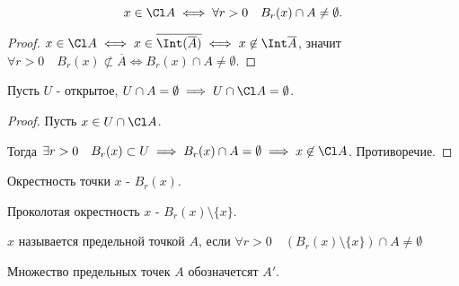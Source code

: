\begin{theorem} \thmslashn

    \[ x\in \Cl A \iff \forall{r > 0}\quad B_{r}(x)\cap A \neq \emptyset .\]

    \begin{proof} \thmslashn
        
        $x\in \Cl A \iff  x\in \overline{\Int(\overline{A})} \iff  x\not\in \Int \overline{A}$, значит $\forall{r > 0}\quad B_{r}(x) \not \subset \overline{A} \iff  B_{r}(x)\cap  A \neq  \emptyset$. 
    \end{proof}
\end{theorem}
\begin{consequence} \thmslashn

    Пусть $U$ - открытое, $U\cap A = \emptyset \implies U\cap \Cl A = \emptyset$.
    \begin{proof}
        Пусть $x\in U\cap \Cl A$.

        Тогда $\exists{r > 0}\quad B_{r}(x) \subset U \implies B_{r}(x)\cap A = \emptyset \implies x \not\in \Cl A$. Противоречие.
    \end{proof}
\end{consequence}
\begin{definition}[Окрестность] \thmslashn 

    Окрестность точки $x$ - $B_{r}(x)$.
\end{definition}
\begin{definition} \thmslashn 

    Проколотая окрестность $x$ - $B_{r}(x) \setminus \{x\} $.
\end{definition}
\begin{definition} \thmslashn 

    $x$ называется предельной точкой $A$, если $\forall{r > 0}\quad (B_{r}(x) \setminus \{x\})\cap A \neq \emptyset $

    Множество предельных точек $A$ обозначетсят $A'$.
\end{definition}
